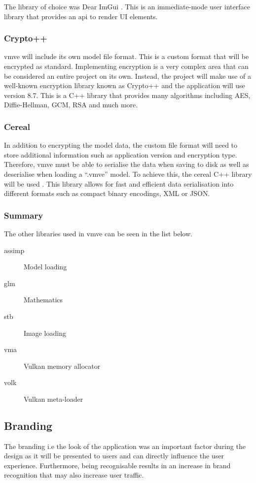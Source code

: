 \documentclass[11pt]{article}
\begin{document}
The library of choice was Dear ImGui \cite{imgui}. This is an immediate-mode
user interface library that provides an \gls*{api} to render UI elements. 

\subsubsection{Crypto++} \label{custom_file_format} \gls*{vmve} will include
its own model file format. This is a custom format that will be encrypted as
standard. Implementing encryption is a very complex area that can be considered
an entire project on its own. Instead, the project will make use of a well-known
encryption library known as Crypto++ \cite{cryptopp} and the application will
use version 8.7. This is a C++ library that provides many algorithms including
AES, Diffie-Hellman, GCM, RSA and much more.

\subsubsection{Cereal}
In addition to encrypting the model data, the custom file format will need to
store additional information such as application version and encryption type.
Therefore, \gls*{vmve} must be able to serialise the data when saving to disk as
well as deserialise when loading a ``.vmve'' model. To achieve this, the cereal
C++ library will be used \cite{cereal}. This library allows for fast and
efficient data serialisation into different formats such as compact binary
encodings, XML or JSON.

\subsubsection{Summary}
The other libraries used in \gls*{vmve} can be seen in the list below.
\begin{description}
  \item[assimp] Model loading
  \item[glm] Mathematics
  \item[stb] Image loading
  \item[vma] Vulkan memory allocator
  \item[volk] Vulkan meta-loader
\end{description}

\subsection{Branding}
The branding i.e the look of the application was an important factor during the
design as it will be presented to users and can directly influence the user
experience. Furthermore, being recognisable results in an increase in brand
recognition that may also increase user traffic.
\end{document}
